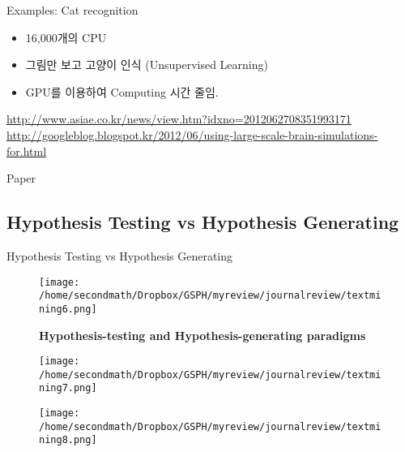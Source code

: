 \documentclass{beamer}
\begin{document}
\begin{frame}{Examples: Cat recognition}
\begin{itemize}
\item 16,000개의 CPU
\item 그림만 보고 고양이 인식 (Unsupervised Learning)
\item GPU를 이용하여 Computing 시간 줄임. 
\end{itemize}
\url{http://www.asiae.co.kr/news/view.htm?idxno=2012062708351993171}
\url{http://googleblog.blogspot.kr/2012/06/using-large-scale-brain-simulations-for.html}
\end{frame}


\begin{frame}{Paper\citep{le2013building,coates2013deep}}
\begin{figure}
\centering
{} 
\end{figure}
\end{frame}



\subsection{Hypothesis Testing vs Hypothesis Generating}

\begin{frame}{Hypothesis Testing vs Hypothesis Generating}
\begin{figure}
\texttt{[image: /home/secondmath/Dropbox/GSPH/myreview/journalreview/textmining6.png]}
\caption{\bf{Hypothesis-testing and Hypothesis-generating
paradigms\citep{biesecker2013hypothesis}}}
\end{figure}
\end{frame}

\begin{frame}
\begin{figure}
\texttt{[image: /home/secondmath/Dropbox/GSPH/myreview/journalreview/textmining7.png]}
\end{figure}
\end{frame}


\begin{frame}
\begin{figure}
\texttt{[image: /home/secondmath/Dropbox/GSPH/myreview/journalreview/textmining8.png]}
\end{figure}
\end{frame}
\end{document}
